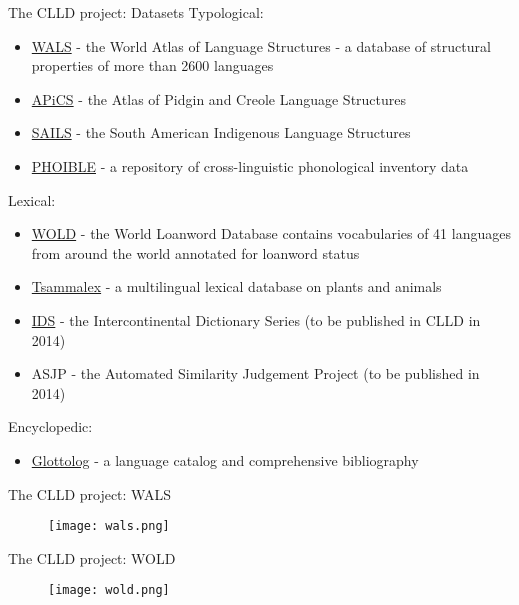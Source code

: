 \documentclass{beamer}
\begin{document}
\begin{frame}{The CLLD project: Datasets}
Typological:
\begin{itemize}
\item \href{http://wals.info}{WALS} -
{\scriptsize the World Atlas of Language Structures - a database of structural properties of more than 2600 languages}
\item \href{http://apics-online.info}{APiCS} -
{\scriptsize the Atlas of Pidgin and Creole Language Structures}
\item \href{http://sails.clld.org}{SAILS} -
{\scriptsize the South American Indigenous Language Structures}
\item \href{http://phoible.org}{PHOIBLE} -
{\scriptsize a repository of cross-linguistic phonological inventory data}
\end{itemize}
Lexical:
\begin{itemize}
\item \href{http://wold.clld.org}{WOLD} -
{\scriptsize the World Loanword Database contains vocabularies of 41 languages from around the world annotated for loanword status}
\item \href{http://tsammalex.clld.org}{Tsammalex} -
{\scriptsize a multilingual lexical database on plants and animals}
\item \href{http://lingweb.eva.mpg.de/ids/}{IDS} -
{\scriptsize the Intercontinental Dictionary Series (to be published in CLLD in 2014)}
\item ASJP -
{\scriptsize the Automated Similarity Judgement Project (to be published in 2014)}
\end{itemize}
Encyclopedic:
\begin{itemize}
\item \href{http://glottolog.org}{Glottolog} -
{\scriptsize a language catalog and comprehensive bibliography}
\end{itemize}
\end{frame}


%
%
\begin{frame}{The CLLD project: WALS}
\begin{figure}
\texttt{[image: wals.png]}
\end{figure}
\end{frame}

\begin{frame}{The CLLD project: WOLD}
\begin{figure}
\texttt{[image: wold.png]}
\end{figure}
\end{frame}
\end{document}
